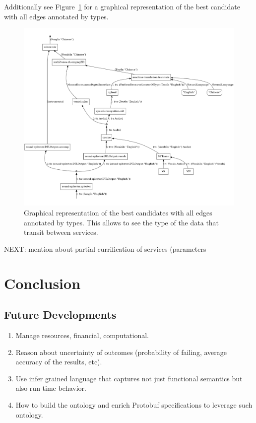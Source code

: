 \documentclass[]{report}
\begin{document}
Additionally see Figure~\ref{fig:cnd3typed} for a graphical
representation of the best candidate with all edges annotated by types.
\begin{figure}[H]
  \centering
  \includegraphics[scale=0.215]{figs/cnd-3-typed.png}
  \caption{Graphical representation of the best candidates with all
    edges annotated by types.  This allows to see the type of the data
    that transit between services.}
  \label{fig:cnd3typed}
\end{figure}
NEXT: mention about partial currification of services (parameters

\chapter{Conclusion}
\section{Future Developments}
\begin{enumerate}
\item Manage resources, financial, computational.
\item Reason about uncertainty of outcomes (probability of failing,
  average accuracy of the results, etc).
\item Use infer grained language that captures not just functional
  semantics but also run-time behavior.
\item How to build the ontology and enrich Protobuf specifications to
  leverage such ontology.
\end{enumerate}
\end{document}
